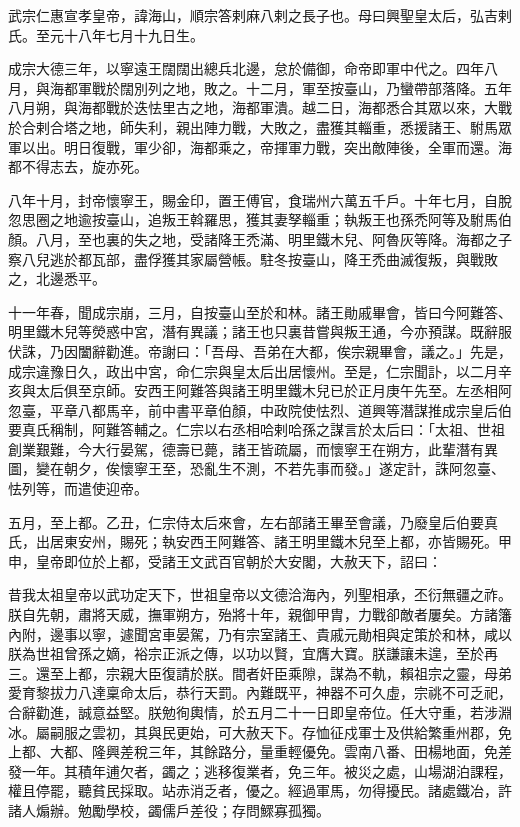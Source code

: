 
\begin{pinyinscope}

 武宗仁惠宣孝皇帝，諱海山，順宗答剌麻八剌之長子也。母曰興聖皇太后，弘吉剌氏。至元十八年七月十九日生。



 成宗大德三年，以寧遠王闊闊出總兵北邊，怠於備御，命帝即軍中代之。四年八月，與海都軍戰於闊別列之地，敗之。十二月，軍至按臺山，乃蠻帶部落降。五年八月朔，與海都戰於迭怯里古之地，海都軍潰。越二日，海都悉合其眾以來，大戰於合剌合塔之地，師失利，親出陣力戰，大敗之，盡獲其輜重，悉援諸王、駙馬眾軍以出。明日復戰，軍少卻，海都乘之，帝揮軍力戰，突出敵陣後，全軍而還。海都不得志去，旋亦死。



 八年十月，封帝懷寧王，賜金印，置王傅官，食瑞州六萬五千戶。十年七月，自脫忽思圈之地逾按臺山，追叛王斡羅思，獲其妻孥輜重；執叛王也孫禿阿等及駙馬伯顏。八月，至也裏的失之地，受諸降王禿滿、明里鐵木兒、阿魯灰等降。海都之子察八兒逃於都瓦部，盡俘獲其家屬營帳。駐冬按臺山，降王禿曲滅復叛，與戰敗之，北邊悉平。



 十一年春，聞成宗崩，三月，自按臺山至於和林。諸王勛戚畢會，皆曰今阿難答、明里鐵木兒等熒惑中宮，潛有異議；諸王也只裏昔嘗與叛王通，今亦預謀。既辭服伏誅，乃因闔辭勸進。帝謝曰：「吾母、吾弟在大都，俟宗親畢會，議之。」先是，成宗違豫日久，政出中宮，命仁宗與皇太后出居懷州。至是，仁宗聞訃，以二月辛亥與太后俱至京師。安西王阿難答與諸王明里鐵木兒已於正月庚午先至。左丞相阿忽臺，平章八都馬辛，前中書平章伯顏，中政院使怯烈、道興等潛謀推成宗皇后伯要真氏稱制，阿難答輔之。仁宗以右丞相哈剌哈孫之謀言於太后曰：「太祖、世祖創業艱難，今大行晏駕，德壽已薨，諸王皆疏屬，而懷寧王在朔方，此輩潛有異圖，變在朝夕，俟懷寧王至，恐亂生不測，不若先事而發。」遂定計，誅阿忽臺、怯列等，而遣使迎帝。



 五月，至上都。乙丑，仁宗侍太后來會，左右部諸王畢至會議，乃廢皇后伯要真氏，出居東安州，賜死；執安西王阿難答、諸王明里鐵木兒至上都，亦皆賜死。甲申，皇帝即位於上都，受諸王文武百官朝於大安閣，大赦天下，詔曰：



 昔我太祖皇帝以武功定天下，世祖皇帝以文德洽海內，列聖相承，丕衍無疆之祚。朕自先朝，肅將天威，撫軍朔方，殆將十年，親御甲胄，力戰卻敵者屢矣。方諸籓內附，邊事以寧，遽聞宮車晏駕，乃有宗室諸王、貴戚元勛相與定策於和林，咸以朕為世祖曾孫之嫡，裕宗正派之傳，以功以賢，宜膺大寶。朕謙讓未遑，至於再三。還至上都，宗親大臣復請於朕。間者奸臣乘隙，謀為不軌，賴祖宗之靈，母弟愛育黎拔力八達稟命太后，恭行天罰。內難既平，神器不可久虛，宗祧不可乏祀，合辭勸進，誠意益堅。朕勉徇輿情，於五月二十一日即皇帝位。任大守重，若涉淵冰。屬嗣服之雲初，其與民更始，可大赦天下。存恤征戍軍士及供給繁重州郡，免上都、大都、隆興差稅三年，其餘路分，量重輕優免。雲南八番、田楊地面，免差發一年。其積年逋欠者，蠲之；逃移復業者，免三年。被災之處，山場湖泊課程，權且停罷，聽貧民採取。站赤消乏者，優之。經過軍馬，勿得擾民。諸處鐵冶，許諸人煽辦。勉勵學校，蠲儒戶差役；存問鰥寡孤獨。




\end{pinyinscope}
